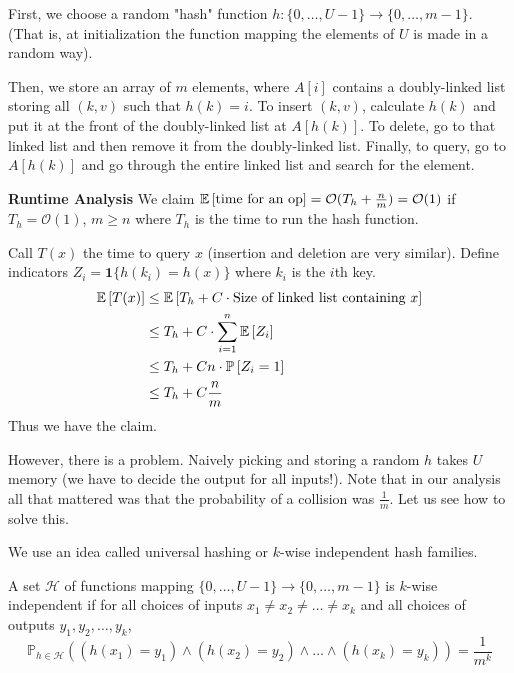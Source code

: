 \begin{algothm}
    First, we choose a random "hash" function $h: \{0, \dots, U - 1\} \rightarrow \{0, \dots, m - 1\}$. (That is, at initialization the function mapping the elements of $U$ is made in a random way).

    Then, we store an array of $m$ elements, where $A[i]$ contains a doubly-linked list storing all $(k, v)$ such that $h(k) = i$.
    To insert $(k, v)$, calculate $h(k)$ and put it at the front of the doubly-linked list at $A[h(k)]$. To delete, go to that linked list and then remove it from the doubly-linked list.
    Finally, to query, go to $A[h(k)]$ and go through the entire linked list and search for the element.

    \textbf{Runtime Analysis}
    We claim $\mathbb{E}\left[ \text{time for an op} \right] = \mathcal{O}(T_h + \frac{n}{m}) = \mathcal{O}(1)$ if $T_h = \mathcal{O}(1)$, $m \geq n$ where $T_h$ is the time to run the hash function.

    \begin{proof*}
        Call $T(x)$ the time to query $x$ (insertion and deletion are very similar). Define indicators $Z_i = \mathbf{1}\{h(k_i) = h(x)\}$ where $k_i$ is the $i$th key.
        \begin{align*}
            \mathbb{E}\left[ T(x) \right] &\leq \mathbb{E}\left[ T_h + C \cdot \text{Size of linked list containing $x$} \right] \\
            &\leq T_h + C \cdot \sum_{i = 1}^n \mathbb{E}\left[ Z_i \right] \\
            &\leq T_h + C n \cdot \mathbb{P}\left[ Z_i = 1 \right] \\
            &\leq T_h + C \frac{n}{m} \\
        \end{align*}
        Thus we have the claim.
    \end{proof*}
\end{algothm}

However, there is a problem. Naively picking and storing a random $h$ takes $U$ memory (we have to decide the output for all inputs!).
Note that in our analysis all that mattered was that the probability of a collision was $\frac{1}{m}$. Let us see how to solve this.

We use an idea called universal hashing or $k$-wise independent hash families.

\begin{definition}
    A set $\mathcal{H}$ of functions mapping $\{0, \dots, U - 1\} \rightarrow \{0, \dots, m - 1\}$ is $k$-wise independent if
    for all choices of inputs $x_1 \neq x_2 \neq \dots \neq x_k$ and all choices of outputs $y_1, y_2, \dots, y_k$,
    \[ \mathbb{P}_{h \in \mathcal{H}} ((h(x_1) = y_1) \land (h(x_2) = y_2) \land \dots \land (h(x_k) = y_k)) = \frac{1}{m^k} \]
\end{definition}

